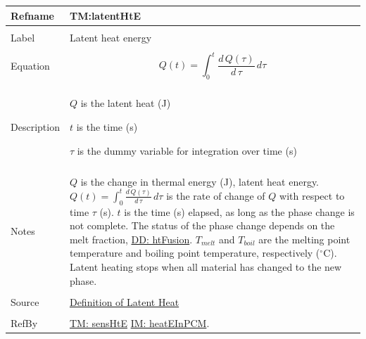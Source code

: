 \documentclass[12pt]{article}
\begin{document}
 \noindent \begin{minipage}{\textwidth}
\begin{tabular}{p{} p{}}
\toprule \textbf{Refname} & \textbf{TM:latentHtE}
\label{TM:latentHtE}
\\ \midrule \\
Label & Latent heat energy
        \\ \midrule \\
        Equation & \begin{dmath}
                   Q\left(t\right)=\int_{0}^{t}{\frac{d\,Q\left(τ\right)}{d\,τ}}\,dτ
                   \end{dmath}
                   \\ \midrule \\
                   Description & \begin{symbDescription}
                                 \item{$Q$ is the latent heat (J)}
                                 \item{$t$ is the time (s)}
                                 \item{$τ$ is the dummy variable for integration over time (s)}
                                 \end{symbDescription}
                                 \\ \midrule \\
                                 Notes & $Q$ is the change in thermal energy (J), latent heat energy. $Q\left(t\right)=\int_{0}^{t}{\frac{d\,Q\left(τ\right)}{d\,τ}}\,dτ$ is the rate of change of $Q$ with respect to time $τ$ (s). $t$ is the time (s) elapsed, as long as the phase change is not complete. The status of the phase change depends on the melt fraction, \hyperref[DD:htFusion]{DD: htFusion}. ${T_{melt}}$ and ${T_{boil}}$ are the melting point temperature and boiling point temperature, respectively (${}^{\circ}$C). Latent heating stops when all material has changed to the new phase.
                                         \\ \midrule \\
                                         Source & \hyperref[http://en.wikipedia.org/wiki/Latent_heat]{Definition of Latent Heat}
                                                  \\ \midrule \\
                                                  RefBy & \hyperref[TM:sensHtE]{TM: sensHtE} \hyperref[IM:heatEInPCM]{IM: heatEInPCM}.
\\ \bottomrule \end{tabular}
\end{minipage}\\
\end{document}
